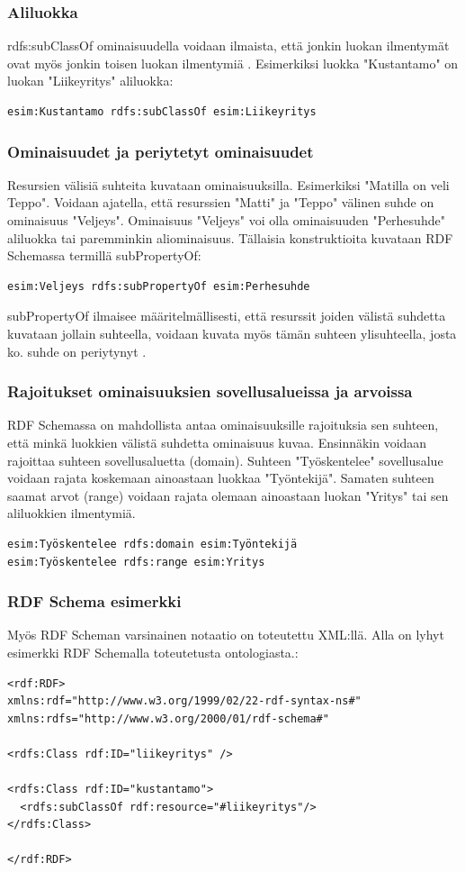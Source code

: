 \documentclass[finnish]{tktltiki2}
\theoremstyle{definition}
\theoremstyle{remark}
\begin{document}
\subsubsection{Aliluokka}
rdfs:subClassOf ominaisuudella voidaan ilmaista, että jonkin luokan ilmentymät ovat myös jonkin toisen luokan ilmentymiä \cite{RDFS}. Esimerkiksi 
luokka "Kustantamo" on luokan "Liikeyritys" aliluokka:
\begin{verbatim}
esim:Kustantamo rdfs:subClassOf esim:Liikeyritys 
\end{verbatim}

\subsubsection{Ominaisuudet ja periytetyt ominaisuudet}
Resursien välisiä suhteita kuvataan ominaisuuksilla. Esimerkiksi "Matilla on veli Teppo". Voidaan ajatella, että resurssien "Matti" ja "Teppo" välinen suhde on ominaisuus "Veljeys". Ominaisuus "Veljeys" voi olla ominaisuuden "Perhesuhde"  aliluokka tai paremminkin aliominaisuus. Tällaisia konstruktioita kuvataan RDF Schemassa termillä subPropertyOf: 
\begin{verbatim}
esim:Veljeys rdfs:subPropertyOf esim:Perhesuhde
\end{verbatim}
 subPropertyOf ilmaisee määritelmällisesti, että resurssit joiden välistä suhdetta kuvataan jollain suhteella, voidaan kuvata myös tämän suhteen ylisuhteella, josta ko. suhde on periytynyt \cite{RDFS}. 
\subsubsection{Rajoitukset ominaisuuksien sovellusalueissa ja arvoissa}
RDF Schemassa on mahdollista antaa ominaisuuksille rajoituksia sen suhteen, että minkä luokkien välistä suhdetta ominaisuus kuvaa. Ensinnäkin
voidaan rajoittaa suhteen sovellusaluetta (domain). Suhteen  "Työskentelee" sovellusalue voidaan rajata koskemaan ainoastaan luokkaa "Työntekijä". Samaten suhteen saamat arvot (range) voidaan rajata olemaan ainoastaan luokan "Yritys" tai sen aliluokkien ilmentymiä. 
\begin{verbatim}
esim:Työskentelee rdfs:domain esim:Työntekijä
esim:Työskentelee rdfs:range esim:Yritys
\end{verbatim}

\subsubsection{RDF Schema esimerkki}
Myös RDF Scheman varsinainen notaatio on toteutettu XML:llä. Alla on lyhyt esimerkki RDF Schemalla toteutetusta ontologiasta.: 
\begin{verbatim}
<rdf:RDF>
xmlns:rdf="http://www.w3.org/1999/02/22-rdf-syntax-ns#"
xmlns:rdfs="http://www.w3.org/2000/01/rdf-schema#"

<rdfs:Class rdf:ID="liikeyritys" />

<rdfs:Class rdf:ID="kustantamo">
  <rdfs:subClassOf rdf:resource="#liikeyritys"/>
</rdfs:Class>

</rdf:RDF>
\end{verbatim}
\end{document}
